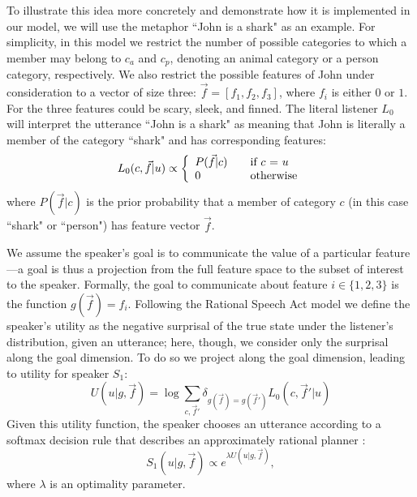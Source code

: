 \documentclass[10pt,letterpaper]{article}
\begin{document}
To illustrate this idea more concretely and demonstrate how it is implemented in our model, we will use the metaphor ``John is a shark" as an example. For simplicity, in this model we restrict the number of possible categories to which a member may belong to $c_a$ and $c_p$, denoting an animal category or a person category, respectively. We also restrict the possible features of John under consideration to a vector of size three: $\vec f = [f_1, f_2, f_3]$, where $f_i$ is either $0$ or $1$. For the three features could be scary, sleek, and finned.
The literal listener $L_0$ will interpret the utterance ``John is a shark" as meaning that John is literally a member of the category ``shark" and has corresponding features:
\[ L_0(c, \vec f |u) \propto \left\{ 
  \begin{array}{l l}
    P(\vec f | c) & \quad \text{if $c$ = $u$}\\
    0 & \quad \text{otherwise}
  \end{array} \right.\]
where $P(\vec f | c)$ is the prior probability that a member of category $c$ (in this case ``shark" or ``person") has feature vector $\vec f$.

We assume the speaker's goal is to communicate the value of a particular feature---a goal is thus a projection from the full feature space to the subset of interest to the speaker. Formally, the goal to communicate about feature $i \in \{1,2,3\}$ is the function $g(\vec f) = f_i$. Following the Rational Speech Act model we define the speaker's utility as the negative surprisal of the true state under the listener's distribution, given an utterance; here, though, we consider only the surprisal along the goal dimension. 
To do so we project along the goal dimension, leading to utility for speaker $S_1$:
\begin{equation}
U(u | g, \vec f) = \log \sum_{c,\vec f'} \delta_{g(\vec f)=g(\vec f')} L_0(c, \vec f' |u)
\end{equation}
Given this utility function, the speaker chooses an utterance according to a softmax decision rule that describes an approximately rational planner \cite{sutton1998reinforcement}:
\begin{equation}
S_1(u | g, \vec f) \propto e^{\lambda U(u | g, \vec f)},
\end{equation}
where $\lambda$ is an optimality parameter. 

%
\end{document}

